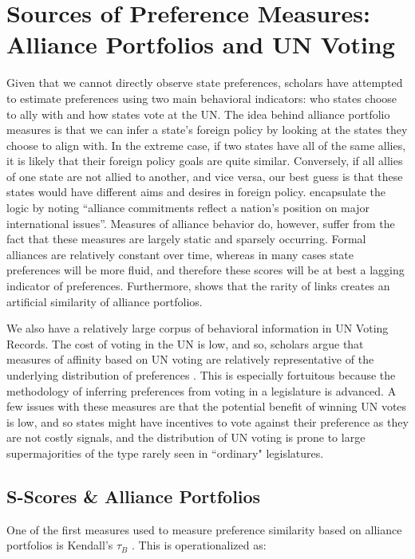 \documentclass[12pt,pdflatex]{elsarticle}
\begin{document}
\section*{Sources of Preference Measures: Alliance Portfolios and UN Voting}

Given that we cannot directly observe state preferences, scholars have attempted to estimate preferences using two main behavioral indicators: who states choose to ally with and how states vote at the UN. The idea behind alliance portfolio measures is that we can infer a state's foreign policy by looking at the states they choose to align with. In the extreme case, if two states have all of the same allies, it is likely that their foreign policy goals are quite similar. Conversely, if all allies of one state are not allied to another, and vice versa, our best guess is that these states would have different aims and desires in foreign policy. \citet{buenodemesquita:lalman:2008} encapsulate the logic by noting ``alliance commitments reflect a nation's position on major international issues''. Measures of alliance behavior do, however, suffer from the fact that these measures are largely static and sparsely occurring. Formal alliances are relatively constant over time, whereas in many cases state preferences will be more fluid, and therefore these scores will be at best a lagging indicator of preferences. Furthermore, \citet{hage:2011} shows that the rarity of links creates an artificial similarity of alliance portfolios.

We also have a relatively large corpus of behavioral information in UN Voting Records. The cost of voting in the UN is low, and so, scholars argue that measures of affinity based on UN voting are relatively representative of the underlying distribution of preferences \citep{gartzke:1998}. This is especially fortuitous because the methodology of inferring preferences from voting in a legislature is advanced. A few issues with these measures are that the potential benefit of winning UN votes is low, and so states might have incentives to vote against their preference as they are not costly signals, and the distribution of UN voting is prone to large supermajorities of the type rarely seen in ``ordinary" legislatures.

\subsection*{S-Scores \& Alliance Portfolios}

 One of the first measures used to measure preference similarity based on alliance portfolios is Kendall's $\tau_{B}$ \citep{buenodemesquita:lalman:2008}. This is operationalized as:
\end{document}
